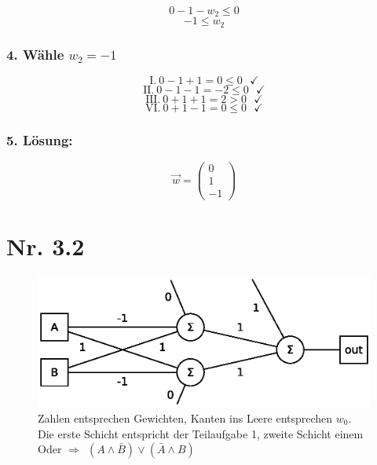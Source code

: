 \documentclass[a4paper,11pt,twoside]{scrartcl}
\begin{document}
\[ 0 -1 -w_2 \leq 0\]
\[ -1 \leq w_2\]
\subsubsection*{4. Wähle $w_2 = -1$}

\[\text{I.}~0 - 1 +1 = 0 \leq 0~~~\checkmark \]
\[\text{II.}~0 - 1 - 1 = -2 \leq 0~~~\checkmark \]
\[\text{III.}~0 + 1 +1 = 2 > 0~~~\checkmark \]
\[\text{VI.}~0 + 1 -1 = 0 \leq 0~~~\checkmark \]

\subsubsection*{5. Lösung:}
\[
\overset{\rightarrow}{w} = \begin{pmatrix}
           0 \\
           1 \\
           -1
         \end{pmatrix}
\] 

\pagebreak

\section*{Nr. 3.2}
\begin{figure}[H]
\centering
\includegraphics{2Layer}
\caption{Zahlen entsprechen Gewichten, Kanten ins Leere entsprechen $w_0$. Die erste Schicht entspricht der Teilaufgabe 1, zweite Schicht einem Oder $\Rightarrow~~ (A\land\bar{B})\lor(\bar{A}\land B)$}
\label{fig:2Layer}
\end{figure}
\end{document}
